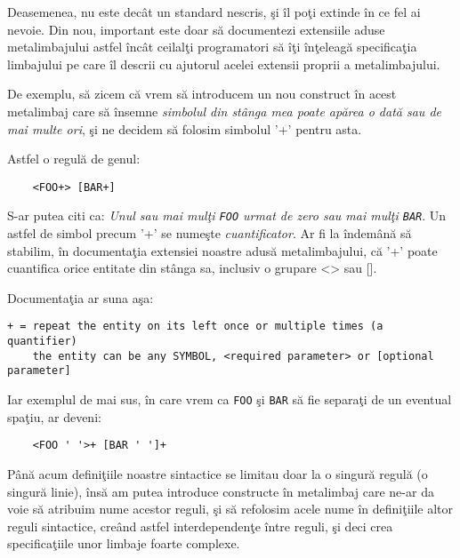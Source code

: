 Deasemenea, nu este decât un standard nescris, şi îl poţi
extinde în ce fel ai nevoie. Din nou, important este doar
să documentezi {\glqq}extensiile{\grqq} aduse metalimbajului astfel
încât ceilalţi programatori să îţi înţeleagă specificaţia
limbajului pe care îl descrii cu ajutorul acelei
extensii proprii a metalimbajului.

De exemplu, să zicem că vrem să introducem un nou
construct în acest metalimbaj care să însemne \textit{simbolul
din stânga mea poate apărea o dată sau de mai multe ori}, şi
ne decidem să folosim simbolul '+' pentru asta.

Astfel o regulă de genul:
\begin{verbatim}
	<FOO+> [BAR+]
\end{verbatim}
S-ar putea citi ca: \textit{Unul sau mai mulţi \texttt{FOO} urmat de zero sau mai
mulţi \texttt{BAR}}. Un astfel de simbol precum '+' se numeşte \textsl{cuantificator}.
Ar fi la îndemână să stabilim, în documentaţia extensiei noastre adusă metalimbajului,
că '+' poate cuantifica orice entitate din stânga sa, inclusiv o grupare <> sau [].

Documentaţia ar suna aşa:
\begin{verbatim}
+ = repeat the entity on its left once or multiple times (a quantifier)
    the entity can be any SYMBOL, <required parameter> or [optional parameter]
\end{verbatim}
Iar exemplul de mai sus, în care vrem ca \texttt{FOO} şi \texttt{BAR}
să fie separaţi de un eventual spaţiu, ar deveni:
\begin{verbatim}
	<FOO ' '>+ [BAR ' ']+
\end{verbatim}

Până acum definiţiile noastre sintactice se limitau doar la
o singură regulă (o singură linie), însă am putea introduce
constructe în metalimbaj care ne-ar da voie să atribuim nume
acestor reguli, şi să refolosim acele nume în definiţiile altor
reguli sintactice, creând astfel interdependenţe între reguli,
şi deci crea specificaţiile unor limbaje foarte complexe.


